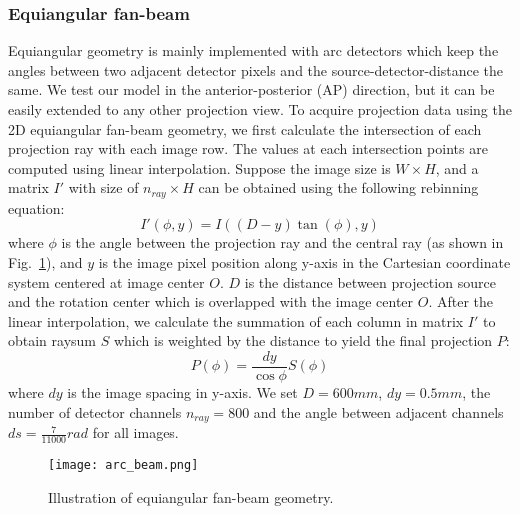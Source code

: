 \documentclass[journal,twoside,web]{ieeecolor}
\begin{document}
\subsubsection{Equiangular fan-beam}
Equiangular geometry is mainly implemented with arc detectors which keep the angles between two adjacent detector pixels and the source-detector-distance the same. We test our model in the anterior-posterior (AP) direction, but it can be easily extended to any other projection view.
To acquire projection data using the 2D equiangular fan-beam geometry, we first calculate the intersection of each projection ray with each image row. The values at each intersection points are computed using linear interpolation. Suppose the image size is \(W{\times}H\), and a matrix \(I'\) with size of \(n_{ray}{\times}H\) can be obtained using the following rebinning equation:
\begin{equation}
    I'(\phi, y)=I((D-y)\tan(\phi), y)
    \label{eq:15}
\end{equation}
where \(\phi\) is the angle between the projection ray and the central ray (as shown in Fig.~\ref{fig:8}), and \(y\) is the image pixel position along y-axis in the Cartesian coordinate system centered at image center \(O\). \(D\) is the distance between projection source and the rotation center which is overlapped with the image center \(O\). After the linear interpolation, we calculate the summation of each column in matrix \(I'\) to obtain raysum $S$ which is weighted by the distance to yield the final projection $P$:
\begin{equation}
    P(\phi)=\frac{dy}{\cos{\phi}}S(\phi)
    \label{eq:16}
\end{equation}
where \(dy\) is the image spacing in y-axis.
We set \(D=600mm\), \(dy=0.5mm\), the number of detector channels \(n_{ray}=800\) and the angle between adjacent channels \(ds=\frac{7}{11000}rad\) for all images.

\begin{figure}[tb]
    \centering
        \texttt{[image: arc\_beam.png]}
        \caption{Illustration of equiangular fan-beam geometry. }
    \label{fig:8}
\end{figure}
\end{document}
